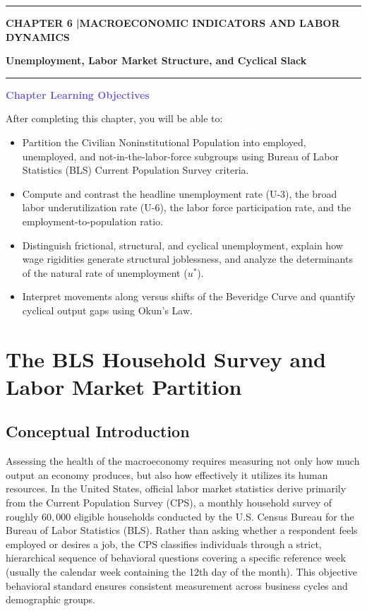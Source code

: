 \documentclass[11pt, a4paper]{article}
\newcommand{\boxheader}[2]{\textbf{\textcolor{#1}{#2}}\par\smallskip}
\begin{document}
{\color{CourseBlue}\rule{\linewidth}{2pt}}
\vspace{4pt}
{\small\bfseries\color{SlateBlue} CHAPTER 6 \quad|\quad MACROECONOMIC INDICATORS AND LABOR DYNAMICS}\par
{\LARGE\bfseries\color{SlateBlue} Unemployment, Labor Market Structure, and Cyclical Slack}\par
\vspace{2pt}
{\color{CourseBlue}\rule{\linewidth}{0.8pt}}
\vspace{6pt}

\begin{casestudy}
\boxheader{SlateBlue}{Chapter Learning Objectives}
After completing this chapter, you will be able to:
\begin{itemize}[leftmargin=1.4em, itemsep=2pt, topsep=2pt]
  \item Partition the Civilian Noninstitutional Population into employed, unemployed, and not-in-the-labor-force subgroups using Bureau of Labor Statistics (BLS) Current Population Survey criteria.
  \item Compute and contrast the headline unemployment rate (U-3), the broad labor underutilization rate (U-6), the labor force participation rate, and the employment-to-population ratio.
  \item Distinguish frictional, structural, and cyclical unemployment, explain how wage rigidities generate structural joblessness, and analyze the determinants of the natural rate of unemployment ($u^*$).
  \item Interpret movements along versus shifts of the Beveridge Curve and quantify cyclical output gaps using Okun's Law.
\end{itemize}
\end{casestudy}

\section{The BLS Household Survey and Labor Market Partition}

\subsection*{Conceptual Introduction}
Assessing the health of the macroeconomy requires measuring not only how much output an economy produces, but also how effectively it utilizes its human resources. In the United States, official labor market statistics derive primarily from the Current Population Survey (CPS), a monthly household survey of roughly $60{,}000$ eligible households conducted by the U.S. Census Bureau for the Bureau of Labor Statistics (BLS). Rather than asking whether a respondent feels employed or desires a job, the CPS classifies individuals through a strict, hierarchical sequence of behavioral questions covering a specific reference week (usually the calendar week containing the 12th day of the month). This objective behavioral standard ensures consistent measurement across business cycles and demographic groups.
\end{document}
